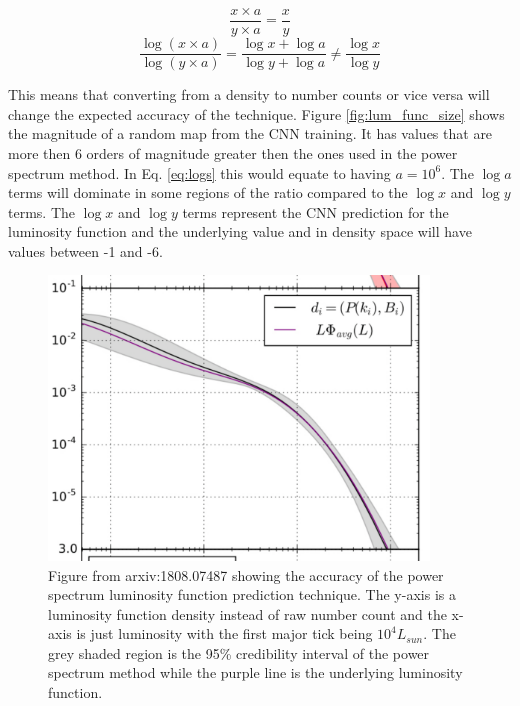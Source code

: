\documentclass{article}
\begin{document}
		\begin{equation}
			\frac{x \times a}{y \times a} = \frac{x}{y}
		\end{equation}
		\begin{equation} \label{eq:logs}
			\frac{\log (x \times a)}{\log (y \times a)} = \frac{\log x + \log a}{\log y + \log a} \neq \frac{\log x}{\log y}
		\end{equation}

		This means that converting from a density to number counts or vice versa will change the expected accuracy of the technique.  Figure \ref{fig:lum_func_size} shows the magnitude of a random map from the CNN training.  It has values that are more then 6 orders of magnitude greater then the ones used in the power spectrum method.  In Eq. \eqref{eq:logs} this would equate to having \(a = 10^6\).  The \(\log a\) terms will dominate in some regions of the ratio compared to the \(\log x\) and \(\log y\) terms.  The \(\log x\) and \(\log y\) terms represent the CNN prediction for the luminosity function and the underlying value and in density space will have values between -1 and -6.

		\begin{figure}[H]
			\centering
			\includegraphics[width=0.9\textwidth]{comap_power_spectrum.pdf}
			\caption{Figure from arxiv:1808.07487 showing the accuracy of the power spectrum luminosity function prediction technique.  The y-axis is a luminosity function density instead of raw number count and the x-axis is just luminosity with the first major tick being \(10^4 L_{sun}\).  The grey shaded region is the 95\% credibility interval of the power spectrum method while the purple line is the underlying luminosity function.}
			\label{fig:comap_power_spectrum}
		\end{figure}
\end{document}
